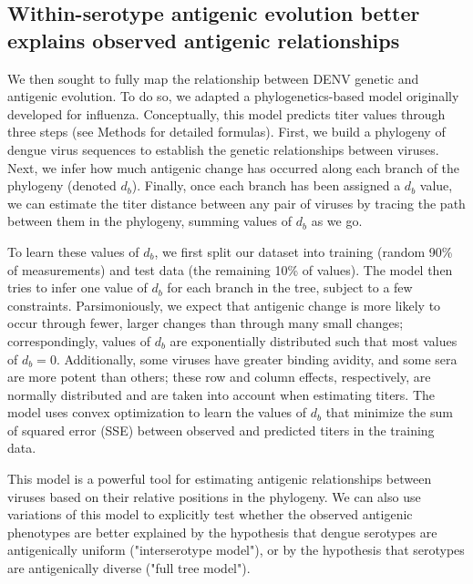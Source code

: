 \documentclass[11pt,oneside,letterpaper]{article}
\begin{document}
\subsection{Within-serotype antigenic evolution better explains observed antigenic relationships}

We then sought to fully map the relationship between DENV genetic and antigenic evolution.
To do so, we adapted a phylogenetics-based model originally developed for influenza. %
Conceptually, this model predicts titer values through three steps (see Methods for detailed formulas).
First, we build a phylogeny of dengue virus sequences to establish the genetic relationships between viruses.
Next, we infer how much antigenic change has occurred along each branch of the phylogeny (denoted $d_b$).
Finally, once each branch has been assigned a $d_b$ value, we can estimate the titer distance between any pair of viruses by tracing the path between them in the phylogeny, summing values of $d_b$ as we go.

To learn these values of $d_b$, we first split our dataset into training (random 90\% of measurements) and test data (the remaining 10\% of values).
The model then tries to infer one value of $d_b$ for each branch in the tree, subject to a few constraints.
Parsimoniously, we expect that antigenic change is more likely to occur through fewer, larger changes than through many small changes; correspondingly, values of $d_b$ are exponentially distributed such that most values of $d_b = 0$.
Additionally, some viruses have greater binding avidity, and some sera are more potent than others; these row and column effects, respectively, are normally distributed and are taken into account when estimating titers.
The model uses convex optimization to learn the values of $d_b$ that minimize the sum of squared error (SSE) between observed and predicted titers in the training data.

This model is a powerful tool for estimating antigenic relationships between viruses based on their relative positions in the phylogeny.
We can also use variations of this model to explicitly test whether the observed antigenic phenotypes are better explained by the hypothesis that dengue serotypes are antigenically uniform ("interserotype model"), or by the hypothesis that serotypes are antigenically diverse ("full tree model").
\end{document}
